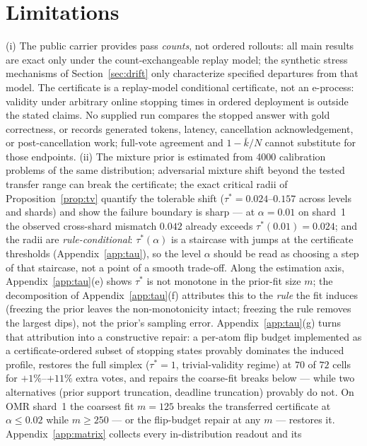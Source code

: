 \documentclass{article}
\theoremstyle{definition}
\theoremstyle{remark}
\begin{document}
\section{Limitations}
\label{sec:limits}
(i) The public carrier provides pass \emph{counts}, not ordered rollouts: all
main results are exact only under the count-exchangeable replay model; the
synthetic stress mechanisms of Section~\ref{sec:drift} only characterize
specified departures from that model. The certificate is a replay-model conditional
certificate, not an e-process: validity under arbitrary online stopping
times in ordered deployment is outside the stated claims. No supplied run
compares the stopped answer with gold correctness, or records generated tokens,
latency, cancellation acknowledgement, or post-cancellation work; full-vote
agreement and $1-\bar k/N$ cannot substitute for those endpoints. (ii) The mixture prior is estimated from 4000
calibration problems of the same distribution; adversarial mixture shift
beyond the tested transfer range can break the certificate; the exact
critical radii of Proposition~\ref{prop:tv} quantify the tolerable shift
($\tau^*=0.024$--$0.157$ across levels and shards) and show the failure
boundary is sharp --- at $\alpha=0.01$ on shard~1 the observed cross-shard
mismatch $0.042$ already exceeds $\tau^*(0.01)=0.024$; and the radii are
\emph{rule-conditional}: $\tau^*(\alpha)$ is a staircase with jumps at the
certificate thresholds (Appendix~\ref{app:tau}), so the level $\alpha$
should be read as choosing a step of that staircase, not a point of a
smooth trade-off. Along the estimation axis, Appendix~\ref{app:tau}(e)
shows $\tau^*$ is not monotone in the prior-fit size $m$; the
decomposition of Appendix~\ref{app:tau}(f) attributes this to the
\emph{rule} the fit induces (freezing the prior leaves the
non-monotonicity intact; freezing the rule removes the largest dips),
not the prior's sampling error. Appendix~\ref{app:tau}(g) turns that
attribution into a constructive repair: a per-atom flip budget
implemented as a certificate-ordered subset of stopping states provably
dominates the induced profile, restores the full simplex
($\tau^*=1$, trivial-validity regime) at $70$ of $72$ cells for
$+1\%$--$+11\%$ extra votes, and repairs the coarse-fit breaks below
--- while two alternatives (prior support truncation, deadline
truncation) provably do not. On OMR shard~1 the coarsest fit
$m{=}125$ breaks the
transferred certificate at $\alpha\le0.02$ while $m\ge250$ --- or the
flip-budget repair at any $m$ --- restores it.
Appendix~\ref{app:matrix} collects every in-distribution readout and its
\end{document}
